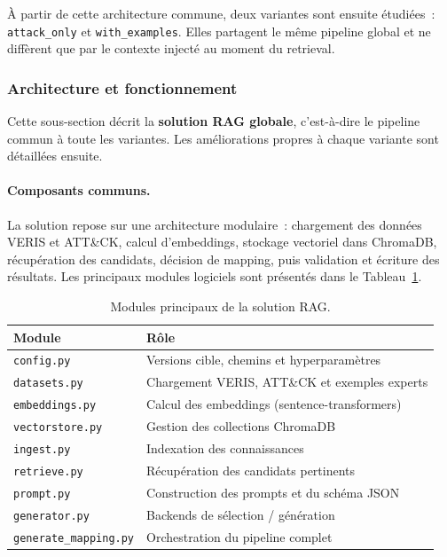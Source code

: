 \documentclass[a4paper,12pt]{article}
\begin{document}
À partir de cette architecture commune, deux variantes sont ensuite étudiées~:
\texttt{attack\_only} et \texttt{with\_examples}. Elles partagent le même pipeline
global et ne diffèrent que par le contexte injecté au moment du retrieval.

\subsubsection{Architecture et fonctionnement}

Cette sous-section décrit la \textbf{solution RAG globale}, c'est-à-dire le
pipeline commun à toute les variantes. Les améliorations propres à chaque variante
sont détaillées ensuite.

\paragraph{Composants communs.}
La solution repose sur une architecture modulaire~: chargement des données VERIS
et ATT\&CK, calcul d'embeddings, stockage vectoriel dans ChromaDB, récupération
des candidats, décision de mapping, puis validation et écriture des résultats.
Les principaux modules logiciels sont présentés dans le
Tableau~\ref{tab:rag-modules}.

\begin{table}[H]
  \centering
  \begin{tabular}{l l}
    \toprule
    \textbf{Module} & \textbf{Rôle} \\
    \midrule
    \texttt{config.py}            & Versions cible, chemins et hyperparamètres \\
    \texttt{datasets.py}          & Chargement VERIS, ATT\&CK et exemples experts \\
    \texttt{embeddings.py}        & Calcul des embeddings (sentence-transformers) \\
    \texttt{vectorstore.py}       & Gestion des collections ChromaDB \\
    \texttt{ingest.py}            & Indexation des connaissances \\
    \texttt{retrieve.py}          & Récupération des candidats pertinents \\
    \texttt{prompt.py}            & Construction des prompts et du schéma JSON \\
    \texttt{generator.py}         & Backends de sélection / génération \\
    \texttt{generate\_mapping.py} & Orchestration du pipeline complet \\
    \bottomrule
  \end{tabular}
  \caption{Modules principaux de la solution RAG.}
  \label{tab:rag-modules}
\end{table}
\end{document}
